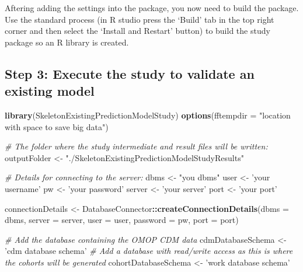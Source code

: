 \documentclass[
]{article}
\newenvironment{Shaded}{\begin{snugshade}}{\end{snugshade}}
\newcommand{\CommentTok}[1]{\textcolor[rgb]{0.56,0.35,0.01}{\textit{#1}}}
\newcommand{\DataTypeTok}[1]{\textcolor[rgb]{0.13,0.29,0.53}{#1}}
\newcommand{\KeywordTok}[1]{\textcolor[rgb]{0.13,0.29,0.53}{\textbf{#1}}}
\newcommand{\NormalTok}[1]{#1}
\newcommand{\OperatorTok}[1]{\textcolor[rgb]{0.81,0.36,0.00}{\textbf{#1}}}
\newcommand{\StringTok}[1]{\textcolor[rgb]{0.31,0.60,0.02}{#1}}
\begin{document}
Aftering adding the settings into the package, you now need to build the
package. Use the standard process (in R studio press the `Build' tab in
the top right corner and then select the `Install and Restart' button)
to build the study package so an R library is created.

\hypertarget{step-3-execute-the-study-to-validate-an-existing-model}{%
\subsection{Step 3: Execute the study to validate an existing
model}\label{step-3-execute-the-study-to-validate-an-existing-model}}

\begin{Shaded}
\begin{Highlighting}[]
  \KeywordTok{library}\NormalTok{(SkeletonExistingPredictionModelStudy)}
  \KeywordTok{options}\NormalTok{(}\DataTypeTok{fftempdir =} \StringTok{"location with space to save big data"}\NormalTok{)}
  
  \CommentTok{# The folder where the study intermediate and result files will be written:}
\NormalTok{  outputFolder <-}\StringTok{ "./SkeletonExistingPredictionModelStudyResults"}
  
  \CommentTok{# Details for connecting to the server:}
\NormalTok{  dbms <-}\StringTok{ "you dbms"}
\NormalTok{  user <-}\StringTok{ 'your username'}
\NormalTok{  pw <-}\StringTok{ 'your password'}
\NormalTok{  server <-}\StringTok{ 'your server'}
\NormalTok{  port <-}\StringTok{ 'your port'}
  
\NormalTok{  connectionDetails <-}\StringTok{ }\NormalTok{DatabaseConnector}\OperatorTok{::}\KeywordTok{createConnectionDetails}\NormalTok{(}\DataTypeTok{dbms =}\NormalTok{ dbms,}
                                                                  \DataTypeTok{server =}\NormalTok{ server,}
                                                                  \DataTypeTok{user =}\NormalTok{ user,}
                                                                  \DataTypeTok{password =}\NormalTok{ pw,}
                                                                  \DataTypeTok{port =}\NormalTok{ port)}
  
  \CommentTok{# Add the database containing the OMOP CDM data}
\NormalTok{  cdmDatabaseSchema <-}\StringTok{ 'cdm database schema'}
  \CommentTok{# Add a database with read/write access as this is where the cohorts will be generated}
\NormalTok{  cohortDatabaseSchema <-}\StringTok{ 'work database schema'}
  

\end{Highlighting}
\end{Shaded}
\end{document}
